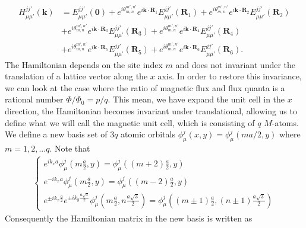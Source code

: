 \documentclass{report}
\begin{document}
\begin{equation}
	\begin{aligned}
		H_{\mu\mu'}^{jj'}(\mathbf{k})
		 & = E_{\mu\mu'}^{jj'}(\mathbf{0}) + e^{i\theta_{m,n}^{m',n'} }e^{i \mathbf{k} \cdot \mathbf{R}_{1}} E_{\mu\mu'}^{jj'}(\mathbf{R}_{1}) + e^{i\theta_{m,n}^{m',n'} } e^{i \mathbf{k} \cdot \mathbf{R}_{2}} E_{\mu\mu'}^{jj'}(\mathbf{R}_{2}) \\
		 & + e^{i\theta_{m,n}^{m',n'} } e^{i \mathbf{k} \cdot \mathbf{R}_{3}} E_{\mu\mu'}^{jj'}(\mathbf{R}_{3}) + e^{i\theta_{m,n}^{m',n'} }e^{i \mathbf{k} \cdot \mathbf{R}_{4}} E_{\mu\mu'}^{jj'}(\mathbf{R}_{4})                                 \\
		 & + e^{i\theta_{m,n}^{m',n'} } e^{i \mathbf{k} \cdot \mathbf{R}_{5}} E_{\mu\mu'}^{jj'}(\mathbf{R}_{5}) + e^{i\theta_{m,n}^{m',n'} }e^{i \mathbf{k} \cdot \mathbf{R}_{6}} E_{\mu\mu'}^{jj'}(\mathbf{R}_{6}).
	\end{aligned}
\end{equation}
The Hamiltonian depends on the site index $m$ and does not invariant under the translation of a lattice vector along the $x$ axis. In order to restore this invariance, we can look at the case where the ratio of magnetic flux and flux quanta is a rational number $\Phi / \Phi_{0} = p / q$. This mean, we have expand the unit cell in the $x$ direction, the Hamiltonian becomes invariant under translational, allowing us to define what we will call the magnetic unit cell, which is consisting of $q$ $M$-atoms. %
We define a new basis set of $3q$ atomic orbitals $\phi_{\mu}^{j} (x,y) = \phi_{\mu}^{j} (ma/2,y)$ where $m = 1,2,...q$. Note that
\begin{gather}
	\begin{cases}
		e^{i k_{x} a} \phi_{\mu}^{j} \left(m \frac{a}{2},y\right) = \phi_{\mu}^{j} \left((m+2)\frac{a}{2},y\right) \\
		e^{-i k_{x} a} \phi_{\mu}^{j} \left(m\frac{a}{2},y\right) = \phi_{\mu}^{j} \left((m-2)\frac{a}{2},y\right) \\
		e^{\pm i k_{x} \frac{a}{2}} e^{\pm i k_{y} \frac{a\sqrt{3}}{2}} \phi_{\mu}^{j} \left(m \frac{a}{2},n \frac{a\sqrt{3}}{2}\right) = \phi_{\mu}^{j} \left((m \pm 1)\frac{a}{2},(n \pm 1)\frac{a\sqrt{3}}{2}\right)
	\end{cases}
\end{gather}
Consequently the Hamiltonian matrix in the new basis is written as
\end{document}
